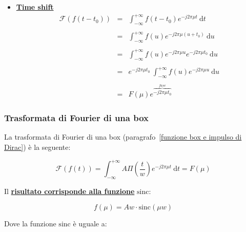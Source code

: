 \documentclass[a4paper]{article}
\begin{document}
\begin{itemize}[label=]
		\item \textcolor{Red3}{\textbf{\underline{Time shift}}}
			\begin{equation*}
				\begin{matrix}
					\mathcal{F}\left(f\left(t-t_{0}\right)\right) & = & \displaystyle \int_{-\infty}^{+\infty} f\left(t-t_{0}\right) e^{-j 2 \pi \mu t} \: \mathrm{d}t \\
					\\
					& = & \displaystyle \int_{-\infty}^{+\infty} f\left(u\right) e^{-j 2 \pi \mu \left(u + t_{0}\right)} \: \mathrm{d}u \\
					\\
					& = & \displaystyle \int_{-\infty}^{+\infty} f\left(u\right) e^{-j 2 \pi \mu u} e^{-j 2 \pi \mu t_{0}} \: \mathrm{d}u \\
					\\
					& = & \displaystyle e^{-j 2 \pi \mu t_{0}} \: \int_{-\infty}^{+\infty} f\left(u\right) e^{-j 2 \pi \mu u} \: \mathrm{d}u \\
					\\
					& = & F\left(\mu\right) e^{\overbrace{- j 2 \pi \mu t_{0}}^{fase}}
				\end{matrix}
			\end{equation*}
	\end{itemize}

	\newpage
	
	\subsubsection{Trasformata di Fourier di una box}
	
	La trasformata di Fourier di una box (paragrafo~\ref{funzione box e impulso di Dirac}) è la seguente:
	
	\begin{equation*}
		\mathcal{F}\left(f\left(t\right)\right) = \int_{-\infty}^{+\infty} A \Pi \left(\dfrac{t}{w}\right) e^{-j 2 \pi \mu t} \: \mathrm{d}t = F\left(\mu\right)
	\end{equation*}

	\noindent
	Il \textbf{\underline{risultato corrisponde alla funzione}} $\mathrm{sinc}$:
	
	\begin{equation*}
		f\left(\mu\right) = Aw \cdot \mathrm{sinc }\left(\mu w\right)
	\end{equation*}
	
	\noindent
	Dove la funzione $\mathrm{sinc}$ è uguale a:
	
\end{document}
